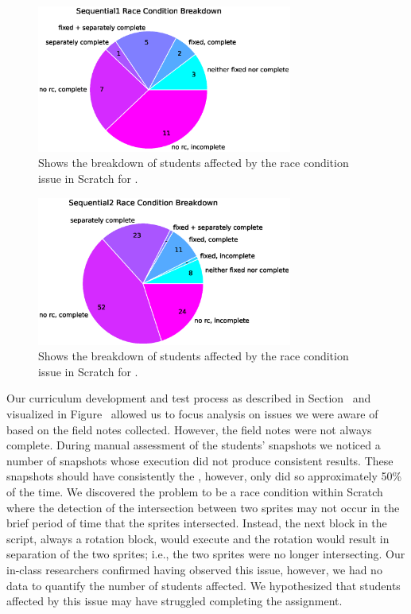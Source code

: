 \begin{figure}[!t]
\centering \includegraphics[width=3.3in]{graphs/race_condition_Sequential1.eps}
\caption{Shows the breakdown of students affected by the race condition issue
  in Scratch for \sone{}.}
\end{figure}

\begin{figure}[!t]
\centering \includegraphics[width=3.3in]{graphs/race_condition_Sequential2.eps}
\caption{Shows the breakdown of students affected by the race condition issue
  in Scratch for \stwo{}.}
\end{figure}

Our curriculum development and test process as described in
Section~ and visualized in Figure~
allowed us to focus analysis on issues we were aware of based on the field
notes collected. However, the field notes were not always complete. During
manual assessment of the students' snapshots we noticed a number of snapshots
whose execution did not produce consistent results. These snapshots should have
consistently \caught{} the \zebra{}, however, only did so approximately 50\% of
the time. We discovered the problem to be a race condition within Scratch where
the detection of the intersection between two sprites may not occur in the
brief period of time that the sprites intersected. Instead, the next block in
the script, always a rotation block, would execute and the rotation would
result in separation of the two sprites; i.e., the two sprites were no longer
intersecting. Our in-class researchers confirmed having observed this issue,
however, we had no data to quantify the number of students affected. We
hypothesized that students affected by this issue may have struggled completing
the assignment.

